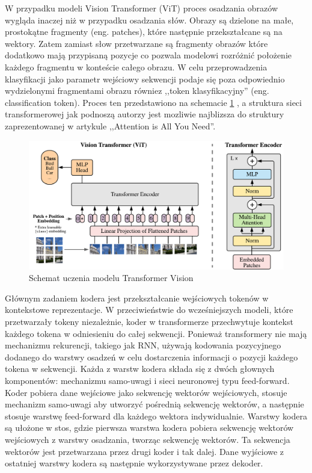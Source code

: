 W przypadku modeli Vision Transformer (ViT) proces osadzania obrazów wygląda inaczej niż w przypadku osadzania słów.
Obrazy są dzielone na małe, prostokątne fragmenty (eng. patches), które następnie przekształcane są na wektory.
Zatem zamiast słow przetwarzane są fragmenty obrazów które dodatkowo mają przypisaną pozycje co pozwala modelowi rozróżnić położenie każdego fragmentu w konteście całego obrazu.
W celu przeprowadzenia klasyfikacji jako parametr wejściowy sekwencji podaje się poza odpowiednio wydzielonymi fragmentami obrazu równiez ,,token klasyfikacyjny'' (eng. classification token).
Proces ten przedstawiono na schemacie \ref{fig:vit_scheme} \cite{DBLP:journals/corr/abs-2010-11929}, a struktura sieci transformerowej jak podnoszą autorzy jest mozliwie najblizsza do struktury zaprezentowanej w artykule ,,Attention is All You Need''.

\begin{figure}[H]
    \centering
	\includegraphics[scale=0.50]{figs/vit_scheme.pdf}
	\caption{Schemat uczenia modelu Transformer Vision}
	\label{fig:vit_scheme}
\end{figure}

Głównym zadaniem kodera jest przekształcanie wejściowych tokenów w kontekstowe reprezentacje. 
W przeciwieństwie do wcześniejszych modeli, które przetwarzały tokeny niezależnie, koder w transformerze przechwytuje kontekst każdego tokena w odniesieniu do całej sekwencji.
Ponieważ transformery nie mają mechanizmu rekurencji, takiego jak RNN, używają kodowania pozycyjnego dodanego do warstwy osadzeń w celu dostarczenia informacji o pozycji każdego tokena w sekwencji.
Każda z warstw kodera składa się z dwóch głownych komponentów: mechanizmu samo-uwagi i sieci neuronowej typu feed-forward. 
Koder pobiera dane wejściowe jako sekwencję wektorów wejściowych, stosuje mechanizm samo-uwagi aby utworzyć pośrednią sekwencję wektorów, a następnie stosuje warstwę feed-forward dla każdego wektora indywidualnie.
Warstwy kodera są ułożone w stos, gdzie pierwsza warstwa kodera pobiera sekwencję wektorów wejściowych z warstwy osadzania, tworząc sekwencję wektorów. 
Ta sekwencja wektorów jest przetwarzana przez drugi koder i tak dalej. 
Dane wyjściowe z ostatniej warstwy kodera są następnie wykorzystywane przez dekoder.

